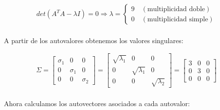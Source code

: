 \documentclass[a4paper, spanish]{article}
\begin{document}
  \begin{align}
    det(A^T A - \lambda I) = 0
    \Rightarrow
    \lambda =
    \begin{cases}
    9 \quad (\text{multiplicidad doble}) \\
    0 \quad (\text{multiplicidad simple})
    \end{cases}
  \end{align}

  \paragraph{}
  A partir de los autovalores obtenemos los valores singulares:

  \begin{align}
    \Sigma =
    \begin{bmatrix}
      \sigma_1 & 0  & 0\\
      0 & \sigma_1  & 0 \\
      0 & 0 & \sigma_2
    \end{bmatrix}
    =
    \begin{bmatrix}
      \sqrt{\lambda_1} & 0 & 0 \\
      0 & \sqrt{\lambda_1} & 0\\
      0 & 0 & \sqrt{\lambda_2}
    \end{bmatrix} =
    \begin{bmatrix}
      3 & 0 & 0 \\
      0 & 3 & 0 \\
      0 & 0 & 0
    \end{bmatrix}
  \end{align}

  \paragraph{}
  Ahora calculamos los autovectores asociados a cada autovalor:
\end{document}
